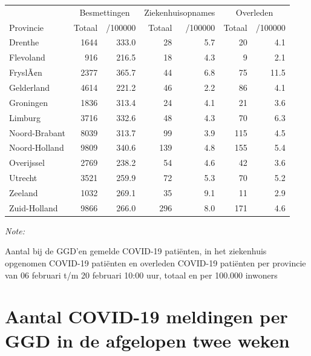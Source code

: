 \documentclass[
  english,
  man,floatsintext]{apa6}
\begin{document}
\begin{table}[H]
\centering
\begin{threeparttable}
\begin{tabular}{lrrrrrr}
\toprule
\multicolumn{1}{c}{ } & \multicolumn{2}{c}{Besmettingen} & \multicolumn{2}{c}{Ziekenhuisopnames} & \multicolumn{2}{c}{Overleden} \\
\cmidrule(l{3pt}r{3pt}){2-3} \cmidrule(l{3pt}r{3pt}){4-5} \cmidrule(l{3pt}r{3pt}){6-7}
Provincie & Totaal & /100000 & Totaal & /100000 & Totaal & /100000\\
\midrule
Drenthe & 1644 & 333.0 & 28 & 5.7 & 20 & 4.1\\
Flevoland & 916 & 216.5 & 18 & 4.3 & 9 & 2.1\\
FryslÃ¢n & 2377 & 365.7 & 44 & 6.8 & 75 & 11.5\\
Gelderland & 4614 & 221.2 & 46 & 2.2 & 86 & 4.1\\
Groningen & 1836 & 313.4 & 24 & 4.1 & 21 & 3.6\\
Limburg & 3716 & 332.6 & 48 & 4.3 & 70 & 6.3\\
Noord-Brabant & 8039 & 313.7 & 99 & 3.9 & 115 & 4.5\\
Noord-Holland & 9809 & 340.6 & 139 & 4.8 & 155 & 5.4\\
Overijssel & 2769 & 238.2 & 54 & 4.6 & 42 & 3.6\\
Utrecht & 3521 & 259.9 & 72 & 5.3 & 70 & 5.2\\
Zeeland & 1032 & 269.1 & 35 & 9.1 & 11 & 2.9\\
Zuid-Holland & 9866 & 266.0 & 296 & 8.0 & 171 & 4.6\\
\bottomrule
\end{tabular}
\begin{tablenotes}
\item \textit{Note: } 
\item Aantal bij de GGD’en gemelde COVID-19 patiënten, in het ziekenhuis opgenomen COVID-19 patiënten en overleden COVID-19 patiënten per provincie van 06 februari t/m 20 februari 10:00 uur, totaal en per 100.000 inwoners
\end{tablenotes}
\end{threeparttable}
\end{table}

\newpage

\hypertarget{aantal-covid-19-meldingen-per-ggd-in-de-afgelopen-twee-weken}{%
\section{Aantal COVID-19 meldingen per GGD in de afgelopen twee weken}\label{aantal-covid-19-meldingen-per-ggd-in-de-afgelopen-twee-weken}}
\end{document}
